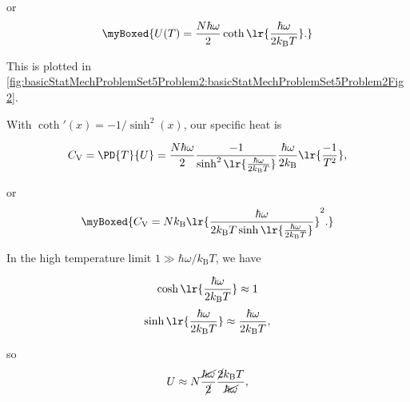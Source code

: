 {or
\begin{equation}\label{eqn:basicStatMechProblemSet5Problem2:280}
\myBoxed{
U(T)
= \frac{N \hbar \omega}{2} \coth 
\lr{ \frac{\hbar \omega}{2 k_{\mathrm{B}} T}}.
}
\end{equation}

This is plotted in \cref{fig:basicStatMechProblemSet5Problem2:basicStatMechProblemSet5Problem2Fig2}.


With $\coth'(x) = -1/\sinh^2(x)$, our specific heat is

\begin{dmath}\label{eqn:basicStatMechProblemSet5Problem2:300}
C_{\mathrm{V}} 
= \PD{T}{U}
= \frac{N \hbar \omega}{2} \frac{-1}{\sinh^2 
\lr{ \frac{\hbar \omega}{2 k_{\mathrm{B}} T}}
} \frac{\hbar \omega}{2 k_{\mathrm{B}}} 
\lr{\frac{-1}{T^2}},
\end{dmath}

or
\begin{equation}\label{eqn:basicStatMechProblemSet5Problem2:320}
\myBoxed{
C_{\mathrm{V}} 
= 
N k_{\mathrm{B}}
\lr{\frac{\hbar \omega}{2 k_{\mathrm{B}} T
\sinh
\lr{ \frac{\hbar \omega}{2 k_{\mathrm{B}} T}}
} }^2.
}
\end{equation}



In the high temperature limit $1 \gg \hbar \omega/k_{\mathrm{B}} T$, we have

\begin{equation}\label{eqn:basicStatMechProblemSet5Problem2:340}
\cosh 
\lr{\frac{\hbar \omega}{2 k_{\mathrm{B}} T}}
\approx 1
\end{equation}
\begin{equation}\label{eqn:basicStatMechProblemSet5Problem2:360}
\sinh 
\lr{\frac{\hbar \omega}{2 k_{\mathrm{B}} T}}
\approx 
\frac{\hbar \omega}{2 k_{\mathrm{B}} T},
\end{equation}

so
\begin{equation}\label{eqn:basicStatMechProblemSet5Problem2:380}
U \approx N \frac{\cancel{\hbar \omega}}{\cancel{2}} \frac{\cancel{2} k_{\mathrm{B}} T}{\cancel{\hbar \omega}},
\end{equation}

}
